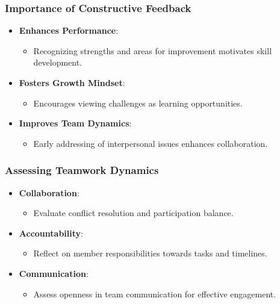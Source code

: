 \documentclass[aspectratio=169]{beamer}
\begin{document}
\begin{frame}[fragile]
    \frametitle{Importance of Constructive Feedback}
    \begin{itemize}
        \item \textbf{Enhances Performance}: 
            \begin{itemize}
                \item Recognizing strengths and areas for improvement motivates skill development.
            \end{itemize}
        \item \textbf{Fosters Growth Mindset}:
            \begin{itemize}
                \item Encourages viewing challenges as learning opportunities.
            \end{itemize}
        \item \textbf{Improves Team Dynamics}:
            \begin{itemize}
                \item Early addressing of interpersonal issues enhances collaboration.
            \end{itemize}
    \end{itemize}
\end{frame}

\begin{frame}[fragile]
    \frametitle{Assessing Teamwork Dynamics}
    \begin{itemize}
        \item \textbf{Collaboration}:
            \begin{itemize}
                \item Evaluate conflict resolution and participation balance.
            \end{itemize}
        \item \textbf{Accountability}:
            \begin{itemize}
                \item Reflect on member responsibilities towards tasks and timelines.
            \end{itemize}
        \item \textbf{Communication}:
            \begin{itemize}
                \item Assess openness in team communication for effective engagement.
            \end{itemize}
    \end{itemize}
\end{frame}
\end{document}
